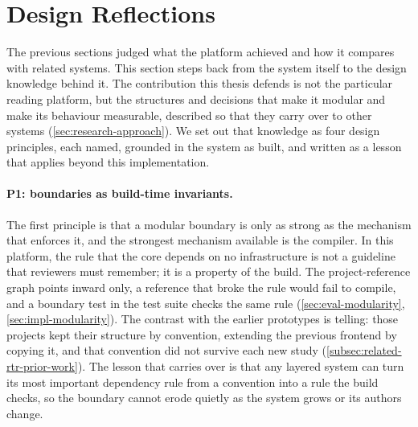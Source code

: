 \section{Design Reflections}
\label{sec:disc-design-reflections}

The previous sections judged what the platform achieved and how it compares with related systems.
This section steps back from the system itself to the design knowledge behind it.
The contribution this thesis defends is not the particular reading platform, but the structures and decisions that make it modular and make its behaviour measurable, described so that they carry over to other systems (\cref{sec:research-approach}).
We set out that knowledge as four design principles, each named, grounded in the system as built, and written as a lesson that applies beyond this implementation.

\paragraph{P1: boundaries as build-time invariants.}
The first principle is that a modular boundary is only as strong as the mechanism that enforces it, and the strongest mechanism available is the compiler.
In this platform, the rule that the core depends on no infrastructure is not a guideline that reviewers must remember; it is a property of the build.
The project-reference graph points inward only, a reference that broke the rule would fail to compile, and a boundary test in the test suite checks the same rule (\cref{sec:eval-modularity}, \cref{sec:impl-modularity}).
The contrast with the earlier prototypes is telling: those projects kept their structure by convention, extending the previous frontend by copying it, and that convention did not survive each new study (\cref{subsec:related-rtr-prior-work}).
The lesson that carries over is that any layered system can turn its most important dependency rule from a convention into a rule the build checks, so the boundary cannot erode quietly as the system grows or its authors change.

